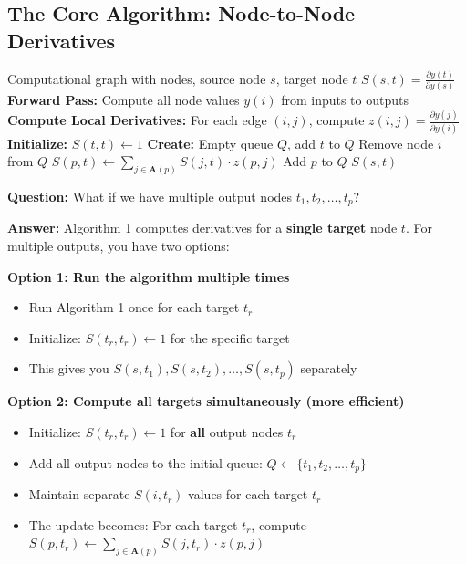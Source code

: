 \begin{notechapter}
\subsection{The Core Algorithm: Node-to-Node Derivatives}

\begin{algorithm}[H]
\caption{Compute Node-to-Node Derivatives (Scalar Version)}
\begin{algorithmic}[1]
\Require Computational graph with nodes, source node $s$, target node $t$
\Ensure $S(s,t) = \frac{\partial y(t)}{\partial y(s)}$
\State \textbf{Forward Pass:} Compute all node values $y(i)$ from inputs to outputs
\State \textbf{Compute Local Derivatives:} For each edge $(i,j)$, compute $z(i,j) = \frac{\partial y(j)}{\partial y(i)}$
\State \textbf{Initialize:} $S(t,t) \gets 1$ 
\State \textbf{Create:} Empty queue $Q$, add $t$ to $Q$
    \State Remove node $i$ from $Q$
     
            \State $S(p,t) \gets \sum_{j \in \mathbf{A}(p)} S(j,t) \cdot z(p,j)$ 
            \State Add $p$ to $Q$
        \EndIf
    \EndFor
\EndWhile
\State \Return $S(s,t)$
\end{algorithmic}
\end{algorithm}

\begin{tcolorbox}[colback=green!5,colframe=green!60,title=Extension to Multiple Output Nodes]
\textbf{Question:} What if we have multiple output nodes $t_1, t_2, \ldots, t_p$?

\textbf{Answer:} Algorithm 1 computes derivatives for a \textbf{single target} node $t$. For multiple outputs, you have two options:

\textbf{Option 1: Run the algorithm multiple times}
\begin{itemize}
    \item Run Algorithm 1 once for each target $t_r$
    \item Initialize: $S(t_r, t_r) \gets 1$ for the specific target
    \item This gives you $S(s, t_1), S(s, t_2), \ldots, S(s, t_p)$ separately
\end{itemize}

\textbf{Option 2: Compute all targets simultaneously (more efficient)}
\begin{itemize}
    \item Initialize: $S(t_r, t_r) \gets 1$ for \textbf{all} output nodes $t_r$
    \item Add all output nodes to the initial queue: $Q \gets \{t_1, t_2, \ldots, t_p\}$
    \item Maintain separate $S(i, t_r)$ values for each target $t_r$
    \item The update becomes: For each target $t_r$, compute $S(p, t_r) \gets \sum_{j \in \mathbf{A}(p)} S(j, t_r) \cdot z(p,j)$
\end{itemize}


\end{tcolorbox}
\end{notechapter}
